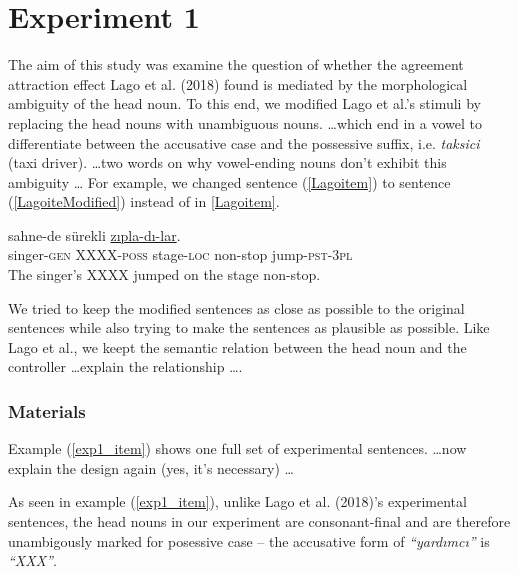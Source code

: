 \documentclass[english,doc]{apa6}
\begin{document}
\hypertarget{experiment-1}{%
\section{Experiment 1}\label{experiment-1}}

The aim of this study was examine the question of whether the agreement attraction effect Lago et al. (2018) found is mediated by the morphological ambiguity of the head noun.
To this end, we modified Lago et al.'s stimuli by replacing the head nouns with unambiguous nouns.
\ldots which end in a vowel to differentiate between the accusative case and the possessive suffix, i.e. \emph{taksici} (taxi driver).
\ldots two words on why vowel-ending nouns don't exhibit this ambiguity \ldots
For example, we changed sentence (\ref{Lagoitem}) to sentence (\ref{LagoiteModified}) instead of in \autoref{Lagoitem}.

\begin{exe}
\ex \label{LagoiteModified}
 sahne-de sürekli \underline{zıpla-dı-lar}.\\
singer-\textsc{gen} XXXX-\textsc{poss} stage-\textsc{loc} non-stop jump-\textsc{pst}-\textsc{3pl}\\
\glt The singer's XXXX jumped on the stage non-stop.
\end{exe}

We tried to keep the modified sentences as close as possible to the original sentences while also trying to make the sentences as plausible as possible.
Like Lago et al., we keept the semantic relation between the head noun and the controller \ldots explain the relationship \ldots.

\hypertarget{materials}{%
\subsubsection{Materials}\label{materials}}

Example (\ref{exp1_item}) shows one full set of experimental sentences. \ldots now explain the design again (yes, it's necessary) \ldots 

As seen in example (\ref{exp1_item}), unlike Lago et al. (2018)'s experimental sentences, the head nouns in our experiment are consonant-final and are therefore unambigously marked for posessive case -- the accusative form of \emph{\enquote{yardımcı}} is \emph{\enquote{XXX}}.
\end{document}
